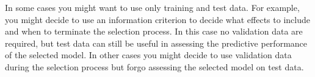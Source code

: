 In some cases you might want to use only training and test data. For example, you might decide to use an information criterion to decide what effects to include and when to terminate the selection process. In this case no validation data are required, but test data can still be useful in assessing the predictive performance of the selected model. In other cases you might decide to use validation data during the selection process but forgo assessing the selected model on test data. 












